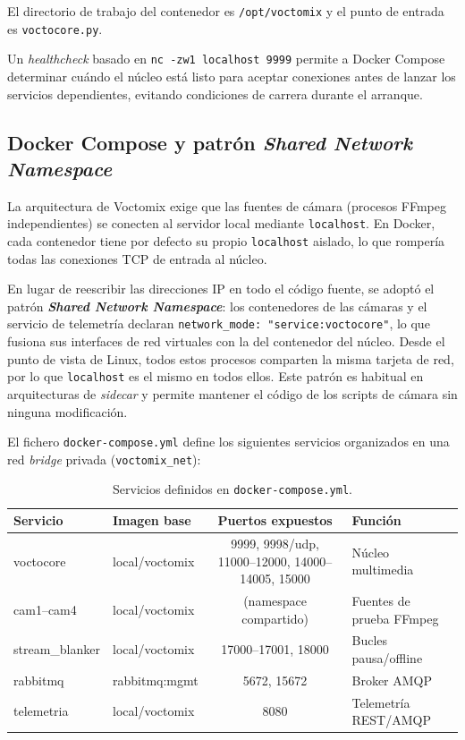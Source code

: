 El directorio de trabajo del contenedor es \texttt{/opt/voctomix} y el punto de
entrada es \texttt{voctocore.py}.

Un \textit{healthcheck} basado en \texttt{nc -zw1 localhost 9999} permite a Docker
Compose determinar cuándo el núcleo está listo para aceptar conexiones antes de lanzar
los servicios dependientes, evitando condiciones de carrera durante el arranque.

\subsection{Docker Compose y patrón \textit{Shared Network Namespace}}
\label{sec:docker_compose}

La arquitectura de Voctomix exige que las fuentes de cámara (procesos FFmpeg
independientes) se conecten al servidor local mediante \texttt{localhost}. En Docker,
cada contenedor tiene por defecto su propio \texttt{localhost} aislado, lo que rompería
todas las conexiones TCP de entrada al núcleo.

En lugar de reescribir las direcciones IP en todo el código fuente, se adoptó el patrón
\textbf{\textit{Shared Network Namespace}}: los contenedores de las cámaras y el servicio de telemetría
declaran \texttt{network\_mode: "service:voctocore"}, lo que fusiona sus interfaces de
red virtuales con la del contenedor del núcleo. Desde el punto de vista de Linux, todos
estos procesos comparten la misma tarjeta de red, por lo que \texttt{localhost} es el
mismo en todos ellos. Este patrón es habitual en arquitecturas de \textit{sidecar} y
permite mantener el código de los scripts de cámara sin ninguna modificación.

El fichero \texttt{docker-compose.yml} define los siguientes servicios organizados en
una red \textit{bridge} privada (\texttt{voctomix\_net}):

\begin{table}[H]
  \centering
  \caption{Servicios definidos en \texttt{docker-compose.yml}.}
  \label{tab:servicios_docker}
  \begin{tabular}{|l|l|c|l|}
    \hline
    \textbf{Servicio} & \textbf{Imagen base} & \textbf{Puertos expuestos} & \textbf{Función} \\
    \hline
    voctocore      & local/voctomix & 9999, 9998/udp, 11000--12000, 14000--14005, 15000 & Núcleo multimedia \\
    cam1--cam4     & local/voctomix & (namespace compartido) & Fuentes de prueba FFmpeg \\
    stream\_blanker& local/voctomix & 17000--17001, 18000 & Bucles pausa/offline \\
    rabbitmq       & rabbitmq:mgmt  & 5672, 15672 & Broker AMQP \\
    telemetria     & local/voctomix & 8080 & Telemetría REST/AMQP \\
    \hline
  \end{tabular}
\end{table}

